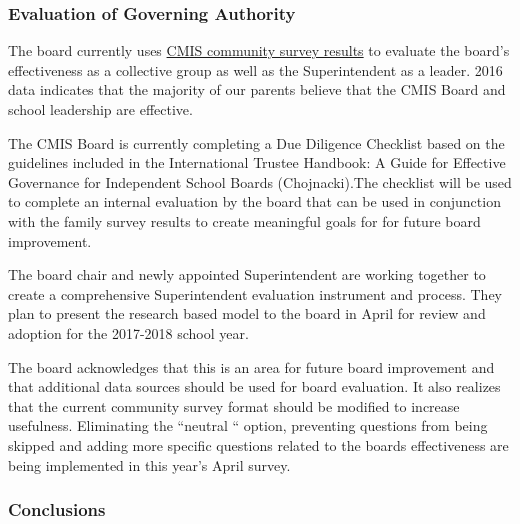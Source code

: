 \subsubsection{Evaluation of Governing Authority}



\begin{findings}
The board currently uses \href{https://docs.google.com/a/cmis.ac.th/document/d/1_otvw47y3Z-1CSjXnKhgRTauVRqPl1S6nSdmsb00O2k/edit?usp=sharing}{CMIS community survey results} to evaluate the board’s effectiveness as a collective group as well as the Superintendent as a leader. 2016 data indicates that the majority of our parents believe that the CMIS Board and school leadership are effective.

The CMIS Board is currently completing a Due Diligence Checklist based on the guidelines included in the International Trustee Handbook: A Guide for Effective Governance for Independent School Boards (Chojnacki).The checklist will be used to complete an internal evaluation by the board that can be used in conjunction with the family survey results to create meaningful goals for for future board improvement.

The board chair and newly appointed Superintendent are working together to create a comprehensive Superintendent evaluation instrument and process. They plan to present the research based model to the board in April for review and adoption for the 2017-2018 school year.


The board acknowledges that this is an area for future board improvement and that additional data sources should be used for board evaluation. It also realizes that the current community survey format should be modified to increase usefulness. Eliminating the “neutral “ option, preventing questions from being skipped and adding more specific questions related to the boards effectiveness are being implemented in this year’s April survey.
\end{findings}

\subsubsection{Conclusions}

